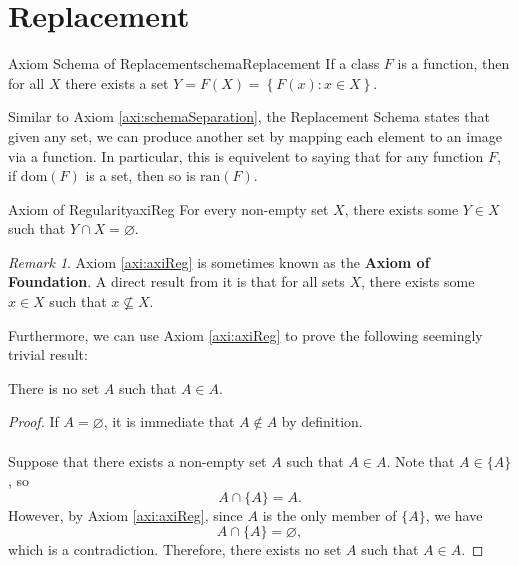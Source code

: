 \documentclass[math]{amznotes}
\theoremstyle{remark}
\newtheorem*{remark}{Remark}
\begin{document}
\section{Replacement}
\begin{axibox}{Axiom Schema of Replacement}{schemaReplacement}
    If a class $F$ is a function, then for all $X$ there exists a set $Y = F(X) = \left\{F(x) \colon x \in X\right\}$.
\end{axibox}
Similar to Axiom \ref{axi:schemaSeparation}, the Replacement Schema states that given any set, we can produce another set by mapping each element to an image via a function. In particular, this is equivelent to saying that for any function $F$, if $\mathrm{dom}(F)$ is a set, then so is $\mathrm{ran}(F)$.
\begin{axibox}{Axiom of Regularity}{axiReg}
    For every non-empty set $X$, there exists some $Y \in X$ such that $Y \cap X = \varnothing$.
\end{axibox}
\begin{notebox}
    \begin{remark}
        Axiom \ref{axi:axiReg} is sometimes known as the {\color{red} \textbf{Axiom of Foundation}}. A direct result from it is that for all sets $X$, there exists some $x \in X$ such that $x \not\subseteq X$.
    \end{remark}
\end{notebox}
Furthermore, we can use Axiom \ref{axi:axiReg} to prove the following seemingly trivial result:
\begin{thmbox}{}{}
    There is no set $A$ such that $A \in A$.
    \tcblower   
    \begin{proof}
        If $A = \varnothing$, it is immediate that $A \notin A$ by definition.
        \\\\
        Suppose that there exists a non-empty set $A$ such that $A \in A$. Note that $A \in \{A\}$, so 
        \begin{equation*}
            A \cap \{A\} = A.
        \end{equation*}
        However, by Axiom \ref{axi:axiReg}, since $A$ is the only member of $\{A\}$, we have 
        \begin{equation*}
            A \cap \{A\} = \varnothing,
        \end{equation*}
        which is a contradiction. Therefore, there exists no set $A$ such that $A \in A$.
    \end{proof}
\end{thmbox}
\end{document}
